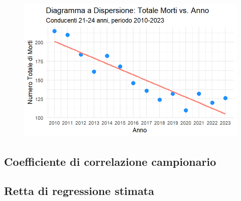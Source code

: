 \documentclass[14pt, openany, titlepage]{report} %
\begin{document}
\begin{figure}[H]
    \centering
    \includegraphics[width=12cm, height=7cm]{Rplot010.png}
\end{figure}

\subsection{Coefficiente di correlazione campionario}

\subsection{Retta di regressione stimata}
\end{document}
